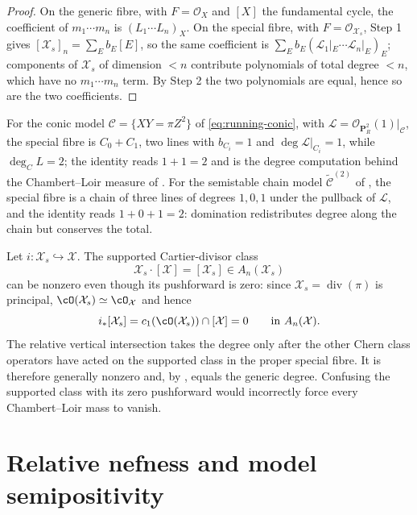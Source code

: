 \begin{proof}
On the generic fibre, with $F=\mathcal O_X$ and $[X]$ the fundamental
cycle, the coefficient of $m_1\cdots m_n$ is $(L_1\cdots L_n)_X$.  On the
special fibre, with $F=\mathcal O_{\mathcal X_s}$, Step 1 gives
$[\mathcal X_s]_n=\sum_Eb_E[E]$, so the same coefficient is
$\sum_Eb_E(\mathcal L_1|_E\cdots\mathcal L_n|_E)_E$; components of
$\mathcal X_s$ of dimension $<n$ contribute polynomials of total degree
$<n$, which have no $m_1\cdots m_n$ term.  By Step 2 the two polynomials
are equal, hence so are the two coefficients.
\end{proof}

\begin{example}
\label{ex:degree-conservation-conic}
For the conic model $\mathcal C=\{XY=\pi Z^2\}$ of
\eqref{eq:running-conic}, with
$\mathcal L=\mathcal O_{\mathbf P^2_R}(1)|_{\mathcal C}$, the special fibre
is $C_0+C_1$, two lines with $b_{C_i}=1$ and
$\deg\mathcal L|_{C_i}=1$, while $\deg_CL=2$; the identity reads
$1+1=2$ and is the degree computation behind the Chambert--Loir measure of
.  For the semistable chain model
$\widetilde{\mathcal C}^{(2)}$ of , the special
fibre is a chain of three lines of degrees $1,0,1$ under the pullback of
$\mathcal L$, and the identity reads $1+0+1=2$: domination redistributes
degree along the chain but conserves the total.
\end{example}

\begin{remark}\label{rem:principal-special-fibre-relative-degree}
Let $i:\mathcal X_s\hookrightarrow\mathcal X$.  The supported Cartier-divisor
class
\[
              \mathcal X_s\mathbin{\cdot}[\mathcal X]
                    =[\mathcal X_s]\in A_n(\mathcal X_s)
\]
can be nonzero even though its pushforward is zero: since
$\mathcal X_s=\operatorname{div}(\pi)$ is principal,
$\cO(\mathcal X_s)\simeq\cO_{\mathcal X}$ and hence
\[
 i_*[\mathcal X_s]
   =c_1(\cO(\mathcal X_s))\cap[\mathcal X]=0
       \qquad\text{in }A_n(\mathcal X).
\]
The relative vertical intersection takes the degree only after the other
Chern class operators have acted on the supported class in the proper special
fibre.  It is therefore generally nonzero and, by
, equals the generic degree.
Confusing the supported class with its zero pushforward would incorrectly
force every Chambert--Loir mass to vanish.
\end{remark}

\section{Relative nefness and model semipositivity}

